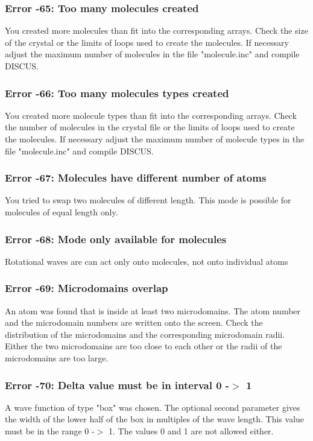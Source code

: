 \subsubsection{Error -65: Too many molecules created}
\par
You created more molecules than fit into the corresponding arrays. 
Check the size of the crystal or the limits of loops used to create 
the molecules. 
If necessary adjust the maximum number of molecules in the file 
"molecule.inc" and compile DISCUS. 
\subsubsection{Error -66: Too many molecules types created}
\par
You created more molecule types than fit into the corresponding arrays. 
Check the number of molecules in the crystal file or the limits of loops 
used to create the molecules. 
If necessary adjust the maximum number of molecule types in the file 
"molecule.inc" and compile DISCUS. 
\subsubsection{Error -67: Molecules have different number of atoms}
\par
You tried to swap two molecules of different length. This mode is 
possible for molecules of equal length only. 
\subsubsection{Error -68: Mode only available for molecules}
\par
Rotational waves are can act only onto molecules, not onto individual 
atoms 
\subsubsection{Error -69: Microdomains overlap}
\par
An atom was found that is inside at least two microdomains. The atom 
number and the microdomain numbers are written onto the screen. 
Check the distribution of the microdomains and the corresponding 
microdomain radii. Either the two microdomains are too close to each 
other or the radii of the microdomains are too large. 
\subsubsection{Error -70: Delta value must be in interval 0 -$> $ 1}
\par
A wave function of type "box" was chosen. The optional second parameter 
gives the width of the lower half of the box in multiples of the 
wave length. This value must be in the range 0 -$> $ 1. The values 0 and 1 
are not allowed either. 
